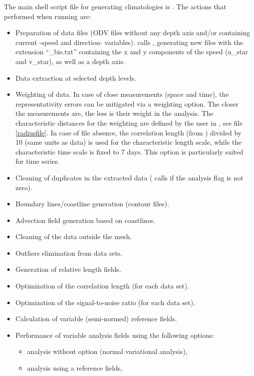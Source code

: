 The main shell script file for generating climatologies is . The actions that performed when running  are:

\begin{itemize}
\item Preparation of data files (ODV files without any depth axis and/or containing current -speed and direction- 
variables).  calls , generating new files with the extension ``\_bis.txt'' containing 
the x and y components of the speed (u\_star and v\_star), as well as a depth axis.
\item Data extraction at selected depth levels.
\item Weighting of data. In case of close measurements (space and time), the representativity errors can be mitigated 
via a weighting option. The closer the measurements are, the less is their weight in the analysis. 
The characteristic distances for the weighting are defined by the user in , see file \ref{radiusfile}. 
In case of file absence,
the correlation length (from ) divided by 10 (same units as data) is used for the characteristic length scale, 
while the characteristic time scale is fixed to 7 days. This option is particularly suited for time series. 
\item Cleaning of duplicates in the extracted data ( calls  if the analysis flag is not zero).
\item Boundary lines/coastline generation (contour files).
\item Advection field generation based on coastlines.
\item Cleaning of the data outside the mesh.
\item Outliers elimination from data sets.
\item Generation of relative length fields.
\item Optimization of the correlation length (for each data set).
\item Optimization of the signal-to-noise ratio (for each data set).
\item Calculation of variable (semi-normed) reference fields.
\item Performance of variable analysis fields using the following options:
\begin{itemize}
\item analysis without option (normal variational analysis),
\item analysis using a reference fields,

\end{itemize}
\end{itemize}
